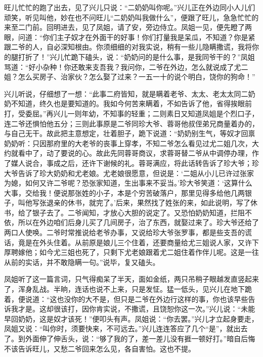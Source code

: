 旺儿忙忙的跑了出去，见了兴儿只说：“二奶奶叫你呢。”兴儿正在外边同小人儿们顽笑，听见叫他，妙在也不问旺儿“二奶奶叫我做什么”，便跟了旺儿，急急忙忙的来至二门前。回明进去，见了凤姐，请了安，旁边侍立。凤姐一见，便先瞪了两眼，问道：“你们主子奴才在外面干的好事！你们打量我是呆瓜，不知道？你是紧跟二爷的人，自必深知根由。你须细细的对我实说，稍有一些儿隐瞒撒谎，我将你的腿打折了！”兴儿忙跪下磕头，说：“奶奶问的是什么事，是我同爷干的？”凤姐骂道：“好小杂种！你还敢来支吾我？我问你，二爷在外边，怎么就说成了尤二姐？怎么买房子、治家伙？怎么娶了过来？一五一十的说个明白，饶你的狗命！”

兴儿听说，仔细想了一想：“此事二府皆知，就是瞒着老爷、太太、老太太同二奶奶不知道，终久也是要知道的。我如今何苦来瞒着，不如告诉了他，省得挨眼前打，受委屈。”再兴儿一则年幼，不知事的轻重；二则素日又知道凤姐是个烈口子，连二爷还惧怕他五分；三则此事原是二爷同珍大爷、蓉哥他叔侄弟兄商量着办的，与自己无干。故此把主意想定，壮着胆子，跪下说道：“奶奶别生气，等奴才回禀奶奶听：只因那府里的大老爷的丧事上穿孝，不知二爷怎么看见过尤二姐几次，大约就看中了，动了要说的心。故此先同蓉哥商议，求蓉哥替二爷从中调停办理，作了媒人说合，事成之后，还许下谢候的礼。蓉哥满应，将此话转告诉了珍大爷；珍大爷告诉了珍大奶奶和尤老娘。尤老娘很愿意，但说是：‘二姐从小儿已许过张家为媳，如何又许二爷呢？恐张家知道，生出事来不妥当。’珍大爷笑道：‘这算什么大事，交给我！便说那张姓的小子，本是个穷苦破落户，那里见得多给他几两银子，叫他写张退亲的休书，就完了。’后来，果然找了姓张的来，如此说明，写了休书，给了银子去了。二爷闻知，才放心大胆的说定了。又恐怕奶奶知道，拦阻不依，所以在外边咱们后身儿买了几间房子，治了东西，就娶过来了。珍大爷还给了两口人使唤。二爷时常推说给老爷办事，又说给珍大爷张罗事，都是些支吾的谎话，竟是在外头住着。从前原是娘儿三个住着，还要商量给尤三姐说人家，又许下厚聘嫁他；如今尤三姐也死了，只剩下尤老娘跟着尤二姐住着作伴儿呢。这是一往从前的实话，并不敢隐瞒一句。”说毕，复又磕头。

凤姐听了这一篇言词，只气得痴呆了半天，面如金纸，两只吊稍子眼越发直竖起来了，浑身乱战。半晌，连话也说不上来，只是发怔。猛一低头，见兴儿在地下跪着，便说道：“这也没你的大不是，但只是二爷在外边行这样的事，你也该早些告诉我才是。这却很该打，因你肯实说，不撒谎，且饶恕你这一次。”兴儿说：“未能早回奶奶，这是奴才该死！”便叩头有声。凤姐说：“你去罢。”兴儿才立起身要走，凤姐又说：“叫你时，须要快来，不可远去。”兴儿连连答应了几个“是”，就出去了。到外面伸了伸舌头，说：“够了我的了，差一差儿没有捱一顿好打。”暗自后悔不该告诉旺儿，又愁二爷回来怎么见，各自害怕。这也不提。

